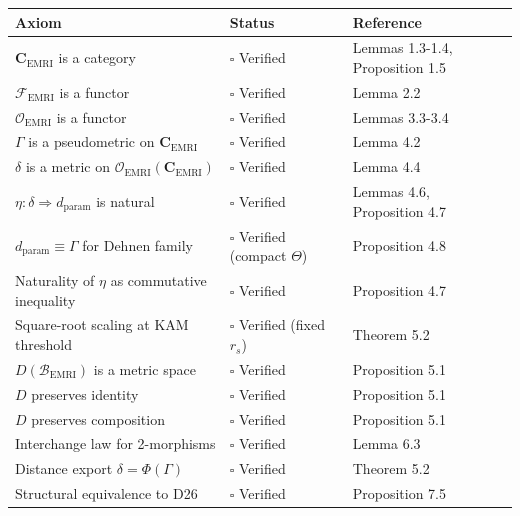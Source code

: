 \documentclass[
]{article}
\newcounter{none} %
\begin{document}
{\def\LTcaptype{none} %
\begin{longtable}[]{@{}
  >{\raggedright\arraybackslash}p{}
  >{\raggedright\arraybackslash}p{}
  >{\raggedright\arraybackslash}p{}@{}}
\toprule\noalign{}
\begin{minipage}[b]{\linewidth}\raggedright
Axiom
\end{minipage} & \begin{minipage}[b]{\linewidth}\raggedright
Status
\end{minipage} & \begin{minipage}[b]{\linewidth}\raggedright
Reference
\end{minipage} \\
\midrule\noalign{}
\endhead
\bottomrule\noalign{}
\endlastfoot
\(\mathbf{C}_{\text{EMRI}}\) is a category & \(\square\) Verified &
Lemmas 1.3-1.4, Proposition 1.5 \\
\(\mathcal{F}_{\text{EMRI}}\) is a functor & \(\square\) Verified &
Lemma 2.2 \\
\(\mathcal{O}_{\text{EMRI}}\) is a functor & \(\square\) Verified &
Lemmas 3.3-3.4 \\
\(\Gamma\) is a pseudometric on \(\mathbf{C}_{\text{EMRI}}\) &
\(\square\) Verified & Lemma 4.2 \\
\(\delta\) is a metric on
\(\mathcal{O}_{\text{EMRI}}(\mathbf{C}_{\text{EMRI}})\) & \(\square\)
Verified & Lemma 4.4 \\
\(\eta: \delta \Rightarrow d_{\text{param}}\) is natural & \(\square\)
Verified & Lemmas 4.6, Proposition 4.7 \\
\(d_{\text{param}} \equiv \Gamma\) for Dehnen family & \(\square\)
Verified (compact \(\Theta\)) & Proposition 4.8 \\
Naturality of \(\eta\) as commutative inequality & \(\square\) Verified
& Proposition 4.7 \\
Square-root scaling at KAM threshold & \(\square\) Verified (fixed
\(r_s\)) & Theorem 5.2 \\
\(D(\mathcal{B}_{\text{EMRI}})\) is a metric space & \(\square\)
Verified & Proposition 5.1 \\
\(D\) preserves identity & \(\square\) Verified & Proposition 5.1 \\
\(D\) preserves composition & \(\square\) Verified & Proposition 5.1 \\
Interchange law for 2-morphisms & \(\square\) Verified & Lemma 6.3 \\
Distance export \(\delta = \Phi(\Gamma)\) & \(\square\) Verified &
Theorem 5.2 \\
Structural equivalence to D26 & \(\square\) Verified & Proposition
7.5 \\
\end{longtable}
}
\end{document}
